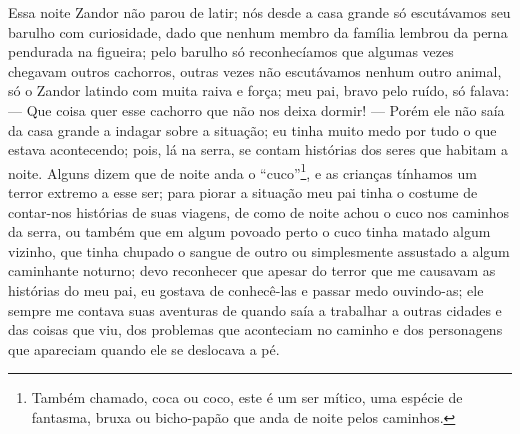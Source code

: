 Essa noite Zandor não parou de latir; nós desde a casa grande só escutávamos seu barulho com curiosidade, dado que nenhum membro da família lembrou da perna pendurada na figueira; pelo barulho só reconhecíamos que algumas vezes chegavam outros cachorros, outras vezes não escutávamos nenhum outro animal, só o Zandor latindo com muita raiva e força; meu pai, bravo pelo ruído, só falava: 
--- Que coisa quer esse cachorro que não nos deixa dormir! --- Porém ele não saía da casa grande a indagar sobre a situação; eu tinha muito medo por tudo o que estava acontecendo; pois, lá na serra, se contam histórias dos seres que habitam a noite. 
Alguns dizem que de noite anda o ``cuco''\footnote{Também chamado, coca ou coco, este é um ser mítico, uma espécie de fantasma, bruxa ou bicho-papão que anda de noite pelos caminhos.}, e as crianças tínhamos um terror extremo a esse ser; para piorar a situação meu pai tinha o costume de contar-nos histórias de suas viagens, de como de noite achou o cuco nos caminhos da serra, ou também que em algum povoado perto o cuco tinha matado algum vizinho, que tinha chupado o sangue de outro ou simplesmente assustado a algum caminhante noturno; devo reconhecer que apesar do terror que me causavam as histórias do meu pai, eu gostava de conhecê-las e passar medo ouvindo-as; ele sempre me contava suas aventuras de quando saía a trabalhar a outras cidades e das coisas que viu, dos problemas que aconteciam no caminho e dos personagens que apareciam quando ele se deslocava a pé.

